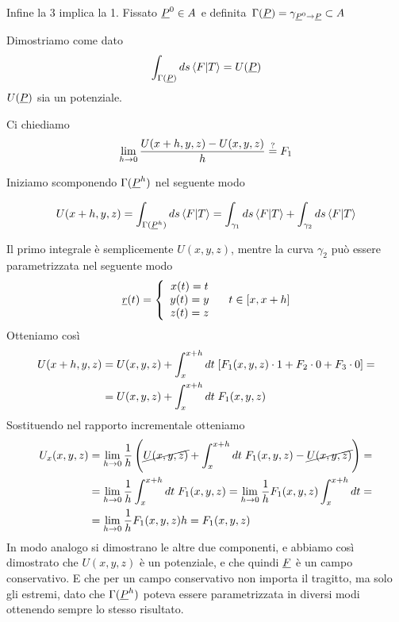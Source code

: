 Infine la 3 implica la 1. Fissato $\underline{P}^0\in A$ e definita $\Gamma(\underline{P}) = \gamma_{\underline{P}^0 \rightarrow\underline{P}}\subset A$

Dimostriamo come dato 
\begin{align}
	\int_{\Gamma(\underline{P})} ds \braket{F|T}=U(\underline{P})
\end{align}
$U(\underline{P})$ sia un potenziale.

Ci chiediamo
\begin{align}
	\underset{h \rightarrow 0}{\lim} \, \frac{U(x+h,y,z) - U(x,y,z)}{h} \overset{?}{=} F_1
\end{align}

\newpage

Iniziamo scomponendo $\Gamma(\underline{P}^h)$ nel seguente modo
\begin{figure}[!htb]
\end{figure}

\begin{align}
	U(x+h,y,z) = \int_{\Gamma(\underline{P}^h)} ds \braket{F|T} = \int_{\gamma_1} ds \braket{F|T} + \int_{\gamma_2} ds \braket{F|T}
\end{align}

Il primo integrale è semplicemente $U(x,y,z)$, mentre la curva $\gamma_2$ può essere parametrizzata nel seguente modo
\begin{align}
	\underline{r}(t)= \left\{\begin{array}{cc} x(t)=t \\ y(t)=y \\ z(t)=z \end{array}\right. \quad t\in[x,x+h]
\end{align}
Otteniamo così
\begin{align}
	U(x+h,y,z) {}&= U(x,y,z) + \int_{x}^{x+h} dt \; [F_1(x,y,z) \cdot 1 + F_2 \cdot 0 + F_3 \cdot 0]= \nonumber \\
	&= U(x,y,z) + \int_{x}^{x+h} dt \; F_1(x,y,z)
\end{align}
Sostituendo nel rapporto incrementale otteniamo
\begin{align}
	U_x(x,y,z) {}&= \underset{h \rightarrow 0}{\lim} \, \frac{1}{h} \left(  \cancel{U(x,y,z)}  + \int_{x}^{x+h} dt \; F_1(x,y,z) - \cancel{U(x,y,z)} \right) = \nonumber \\
	&= \underset{h \rightarrow 0}{\lim} \, \frac{1}{h} \int_{x}^{x+h} dt \; F_1(x,y,z) = \underset{h \rightarrow 0}{\lim} \, \frac{1}{h} F_1(x,y,z) \int_{x}^{x+h} dt = \nonumber \\
	&= \underset{h \rightarrow 0}{\lim} \, \frac{1}{h} F_1(x,y,z) h = F_1(x,y,z)
\end{align}
In modo analogo si dimostrano le altre due componenti, e abbiamo così dimostrato che $U(x,y,z)$ è un potenziale, e che quindi $\underline{F}$ è un campo conservativo. E che per un campo conservativo non importa il tragitto, ma solo gli estremi, dato che $\Gamma(\underline{P}^h)$ poteva essere parametrizzata in diversi modi ottenendo sempre lo stesso risultato.

